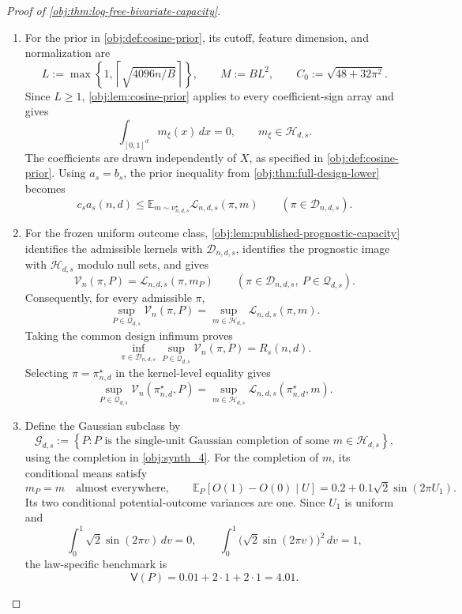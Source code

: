 \documentclass[11pt]{article}
\begin{document}
\begin{proof}[Proof of \cref{obj:thm:log-free-bivariate-capacity}]
\begin{enumerate}
\item
For the prior in \cref{obj:def:cosine-prior}, its cutoff, feature dimension, and normalization are
\[
L:=\max\left\{1,\left\lceil\sqrt{4096n/B}\right\rceil\right\},
\qquad
M:=BL^2,
\qquad
C_0:=\sqrt{48+32\pi^2}.
\]
Since \(L\geq1\), \cref{obj:lem:cosine-prior} applies to every coefficient-sign array and gives
\[
\int_{[0,1]^d}m_\xi(x)\,dx=0,
\qquad
m_\xi\in\mathcal H_{d,s}.
\]
The coefficients are drawn independently of \(X\), as specified in \cref{obj:def:cosine-prior}. Using \(a_s=b_s\), the prior inequality from \cref{obj:thm:full-design-lower} becomes
\[
c_sa_s(n,d)
\leq
\mathbb E_{m\sim\nu^\star_{n,d,s}}
\mathcal L_{n,d,s}(\pi,m)
\qquad(\pi\in\mathcal D_{n,d,s}).
\]

\item
For the frozen uniform outcome class, \cref{obj:lem:published-prognostic-capacity} identifies the admissible kernels with \(\mathcal D_{n,d,s}\), identifies the prognostic image with \(\mathcal H_{d,s}\) modulo null sets, and gives
\[
\mathcal V_n(\pi,P)
=
\mathcal L_{n,d,s}(\pi,m_P)
\qquad
(\pi\in\mathcal D_{n,d,s},\ P\in\mathcal Q_{d,s}).
\]
Consequently, for every admissible \(\pi\),
\[
\sup_{P\in\mathcal Q_{d,s}}\mathcal V_n(\pi,P)
=
\sup_{m\in\mathcal H_{d,s}}\mathcal L_{n,d,s}(\pi,m).
\]
Taking the common design infimum proves
\[
\inf_{\pi\in\mathcal D_{n,d,s}}
\sup_{P\in\mathcal Q_{d,s}}\mathcal V_n(\pi,P)
=
R_s(n,d).
\]
Selecting \(\pi=\pi^\star_{n,d}\) in the kernel-level equality gives
\[
\sup_{P\in\mathcal Q_{d,s}}
\mathcal V_n(\pi^\star_{n,d},P)
=
\sup_{m\in\mathcal H_{d,s}}
\mathcal L_{n,d,s}(\pi^\star_{n,d},m).
\]

\item
Define the Gaussian subclass by
\[
\mathcal G_{d,s}
:=
\left\{
P:
P\text{ is the single-unit Gaussian completion of some }
m\in\mathcal H_{d,s}
\right\},
\]
using the completion in \cref{obj:synth_4}. For the completion of \(m\), its conditional means satisfy
\[
m_P=m\quad\text{almost everywhere},
\qquad
\mathbb E_P[O(1)-O(0)\mid U]
=
0.2+0.1\sqrt2\sin(2\pi U_1).
\]
Its two conditional potential-outcome variances are one. Since \(U_1\) is uniform and
\[
\int_0^1\sqrt2\sin(2\pi v)\,dv=0,
\qquad
\int_0^1\bigl(\sqrt2\sin(2\pi v)\bigr)^2\,dv=1,
\]
the law-specific benchmark is
\[
\mathsf V(P)=0.01+2\cdot1+2\cdot1=4.01.
\]


\end{enumerate}
\end{proof}
\end{document}
